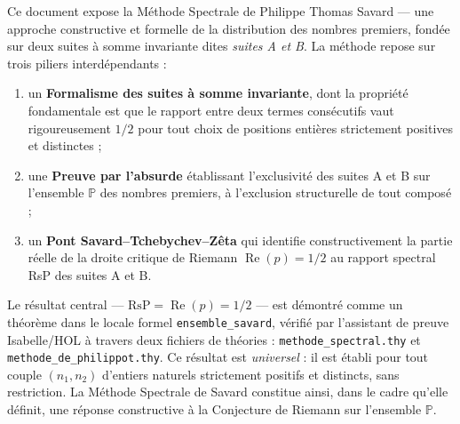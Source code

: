 \documentclass[11pt,a4paper]{article}
\begin{document}
Ce document expose la Méthode Spectrale de Philippe Thomas Savard --- une approche constructive et formelle de la distribution des nombres premiers, fondée sur deux suites à somme invariante dites \emph{suites A et B}. La méthode repose sur trois piliers interdépendants :
\begin{enumerate}
  \item un \textbf{Formalisme des suites à somme invariante}, dont la propriété fondamentale est que le rapport entre deux termes consécutifs vaut rigoureusement $1/2$ pour tout choix de positions entières strictement positives et distinctes ;
  \item une \textbf{Preuve par l'absurde} établissant l'exclusivité des suites A et B sur l'ensemble $\mathbb{P}$ des nombres premiers, à l'exclusion structurelle de tout composé ;
  \item un \textbf{Pont Savard–Tchebychev–Zêta} qui identifie constructivement la partie réelle de la droite critique de Riemann $\operatorname{Re}(p) = 1/2$ au rapport spectral RsP des suites A et B.
\end{enumerate}

Le résultat central --- $\text{RsP} = \operatorname{Re}(p) = 1/2$ --- est démontré comme un théorème dans le locale formel \texttt{ensemble\_savard}, vérifié par l'assistant de preuve Isabelle/HOL à travers deux fichiers de théories : \texttt{methode\_spectral.thy} et \texttt{methode\_de\_philippot.thy}. Ce résultat est \emph{universel} : il est établi pour tout couple $(n_1, n_2)$ d'entiers naturels strictement positifs et distincts, sans restriction. La Méthode Spectrale de Savard constitue ainsi, dans le cadre qu'elle définit, une réponse constructive à la Conjecture de Riemann sur l'ensemble $\mathbb{P}$.
\end{document}
